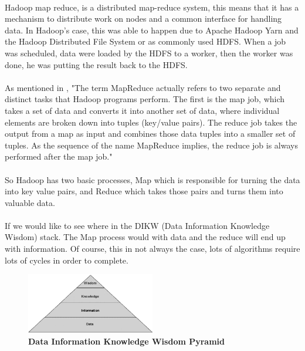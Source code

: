 \paragraph{}Hadoop map reduce, is a distributed map-reduce system, 
this means that it has a mechanism to distribute work on nodes and a common interface for handling data. In Hadoop's case, this was able to happen due to Apache Hadoop Yarn and the Hadoop Distributed File System or as commonly used HDFS. When a job was scheduled, data were loaded by the HDFS to a worker, 
then the worker was done, he was putting the result back to the HDFS. 

\paragraph{}As mentioned in \cite{ibmMapReduce:5}, "The term MapReduce actually refers to two separate and distinct tasks that Hadoop programs perform. The first is the map job, which takes a set of data and converts it into another set of data, where individual elements are broken down into tuples (key/value pairs). The reduce job takes the output from a map as input and combines those data tuples into a smaller set of tuples. As the sequence of the name MapReduce implies, the reduce job is always performed after the map job."

\paragraph{}So Hadoop has two basic processes, Map which is responsible for turning the data into key value pairs, and Reduce which takes those pairs and turns them into valuable data.

\paragraph{}If we would like to see where in the DIKW (Data Information Knowledge Wisdom) stack. The Map process would with data and the reduce will end up with information. Of course, this in not always the case, lots of algorithms require lots of cycles in order to complete. \\
 
\begin{figure}[h]
	\centering
	\includegraphics[width=0.5\textwidth]{images/DIKW.png}
	\caption{\bfseries Data Information Knowledge Wisdom Pyramid \cite{TheWisdomHierachy:7}}
	\label{dikw}
\end{figure}
